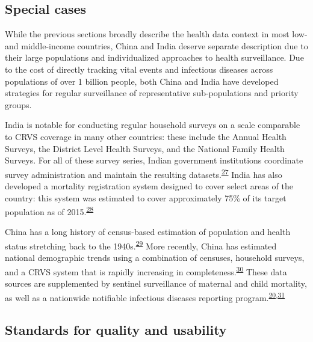 \documentclass[
]{article}
\begin{document}
\hypertarget{special-cases}{%
\subsection{Special cases}\label{special-cases}}

While the previous sections broadly describe the health data context in most low- and middle-income countries, China and India deserve separate description due to their large populations and individualized approaches to health surveillance. Due to the cost of directly tracking vital events and infectious diseases across populations of over 1 billion people, both China and India have developed strategies for regular surveillance of representative sub-populations and priority groups.

India is notable for conducting regular household surveys on a scale comparable to CRVS coverage in many other countries: these include the Annual Health Surveys, the District Level Health Surveys, and the National Family Health Surveys. For all of these survey series, Indian government institutions coordinate survey administration and maintain the resulting datasets.\textsuperscript{\protect\hyperlink{ref-Dandona2016}{27}} India has also developed a mortality registration system designed to cover select areas of the country: this system was estimated to cover approximately 75\% of its target population as of 2015.\textsuperscript{\protect\hyperlink{ref-Kumar2019}{28}}

China has a long history of census-based estimation of population and health status stretching back to the 1940s.\textsuperscript{\protect\hyperlink{ref-Banister2004}{29}} More recently, China has estimated national demographic trends using a combination of censuses, household surveys, and a CRVS system that is rapidly increasing in completeness.\textsuperscript{\protect\hyperlink{ref-Zeng2020}{30}} These data sources are supplemented by sentinel surveillance of maternal and child mortality, as well as a nationwide notifiable infectious diseases reporting program.\textsuperscript{\protect\hyperlink{ref-Vlieg2017}{20},\protect\hyperlink{ref-He2017}{31}}

\hypertarget{standards-for-quality-and-usability}{%
\subsection{Standards for quality and usability}\label{standards-for-quality-and-usability}}
\end{document}
